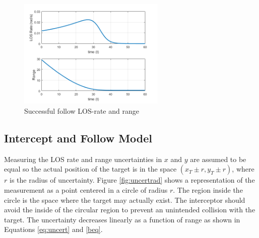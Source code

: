 \documentclass[conference]{IEEEtran}
\begin{document}
\begin{figure}[H]
	\centering
	\includegraphics[width=7cm] {x15_range_LOSrate}
	\caption{Successful follow LOS-rate and range}
	\label{fig:successfulFollowLOS}
		\hspace*{0mm}
\end{figure}


%		


\subsection{Intercept and Follow Model}
Measuring the LOS rate and range uncertainties in $x$ and $y$ are assumed to be equal so the actual position of the target is in the space $(x_T\pm r,y_T \pm r)$, where $r$ is the radius of uncertainty. Figure \ref{fig:uncertrad} shows a representation of the measurement as a point centered in a circle of radius $r$. The region inside the circle is the space where the target may actually exist. The interceptor should avoid the inside of the circular region to prevent an unintended collision with the target. The uncertainty decreases linearly as a function of range as shown in Equations \ref{eq:uncert} and \ref{beq}.
\end{document}
